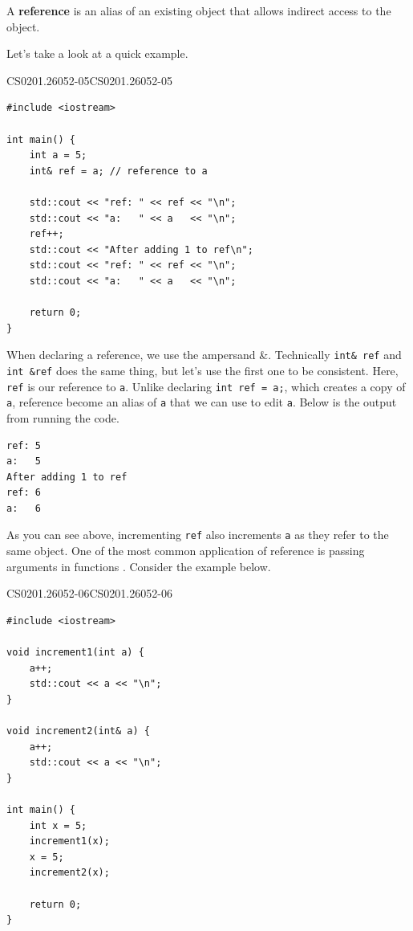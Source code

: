 \documentclass[../../../main.tex]{subfiles}
\begin{document}
\begin{definition}{}{}
A \textbf{reference} is an alias of an existing object that allows
indirect access to the object.
\end{definition}

Let's take a look at a quick example.

\begin{cppbox}{CS0201.26052-05}{CS0201.26052-05}
\begin{lstlisting}[style=cppstyle]
#include <iostream>

int main() {
    int a = 5;
    int& ref = a; // reference to a

    std::cout << "ref: " << ref << "\n";
    std::cout << "a:   " << a   << "\n";
    ref++;
    std::cout << "After adding 1 to ref\n";
    std::cout << "ref: " << ref << "\n";
    std::cout << "a:   " << a   << "\n";

    return 0;
}
\end{lstlisting}
\end{cppbox}

When declaring a reference, we use the ampersand \&. Technically
\verb|int& ref| and \verb|int &ref| does the same thing, but let's
use the first one to be consistent. Here, \verb|ref| is our
reference to \verb|a|. Unlike declaring \verb|int ref = a;|, which
creates a copy of \verb|a|, reference become an alias of \verb|a|
that we can use to edit \verb|a|. Below is the output from running
the code.

\begin{outputbox}
\begin{lstlisting}[style=basic]
ref: 5
a:   5
After adding 1 to ref
ref: 6
a:   6
\end{lstlisting}
\end{outputbox}

As you can see above, incrementing \verb|ref| also increments \verb|a|
as they refer to the same object. One of the most common application
of reference is passing arguments in functions \cite{CS02-5}.
Consider the example below.

\begin{cppbox}{CS0201.26052-06}{CS0201.26052-06}
\begin{lstlisting}[style=cppstyle]
#include <iostream>

void increment1(int a) {
    a++;
    std::cout << a << "\n";
}

void increment2(int& a) {
    a++;
    std::cout << a << "\n";
}

int main() {
    int x = 5;
    increment1(x);
    x = 5;
    increment2(x);

    return 0;
}
\end{lstlisting}
\end{cppbox}
\end{document}
